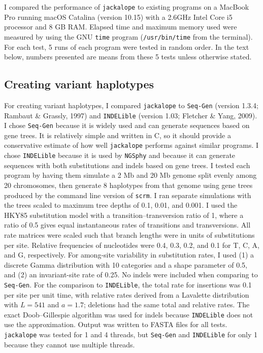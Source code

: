 \documentclass[12pt,]{article}
\begin{document}
I compared the performance of \texttt{jackalope} to existing programs on a MacBook
Pro running macOS Catalina (version 10.15) with a 2.6GHz Intel Core i5 processor
and 8 GB RAM.
Elapsed time and maximum memory used were measured by using the GNU \texttt{time} program
(\texttt{/usr/bin/time} from the terminal).
For each test, 5 runs of each program were tested in random order.
In the text below, numbers presented are means from these 5 tests unless otherwise stated.

\hypertarget{creating-variant-haplotypes-1}{%
\subsection{Creating variant haplotypes}\label{creating-variant-haplotypes-1}}

For creating variant haplotypes, I compared \texttt{jackalope} to
\texttt{Seq-Gen} (version 1.3.4; Rambaut \& Grassly, 1997) and
\texttt{INDELible} (version 1.03; Fletcher \& Yang, 2009).
I chose \texttt{Seq-Gen} because it is widely used and can generate sequences based on
gene trees.
It is relatively simple and written in C, so it should provide a conservative
estimate of how well \texttt{jackalope} performs against similar programs.
I chose \texttt{INDELible} because it is used by \texttt{NGSphy} and because it can generate
sequences with both substitutions and indels based on gene trees.
I tested each program by having them simulate a 2 Mb and 20 Mb genome
split evenly among 20 chromosomes, then generate 8 haplotypes from that genome using
gene trees produced by the command line version of \texttt{scrm}.
I ran separate simulations with the trees scaled to maximum tree depths of 0.1, 0.01,
and 0.001.
I used the HKY85 substitution model with a transition--transversion ratio of 1,
where a ratio of 0.5 gives equal instantaneous rates of transitions and transversions.
All rate matrices were scaled such that branch lengths were in units of
substitutions per site.
Relative frequencies of nucleotides were 0.4, 0.3, 0.2, and 0.1 for T, C, A, and G,
respectively.
For among-site variability in substitution rates, I used
(1) a discrete Gamma distribution with 10 categories and a shape parameter of 0.5, and
(2) an invariant-site rate of 0.25.
No indels were included when comparing to \texttt{Seq-Gen}.
For the comparison to \texttt{INDELible}, the total rate for insertions was 0.1 per site
per unit time, with relative rates derived from a Lavalette distribution with
\(L = 541\) and \(a = 1.7\); deletions had the same total and relative rates.
The exact Doob--Gillespie algorithm was used for indels because \texttt{INDELible} does
not use the approximation.
Output was written to FASTA files for all tests.
\texttt{jackalope} was tested for 1 and 4 threads, but
\texttt{Seq-Gen} and \texttt{INDELible} for only 1 because they cannot use multiple threads.
\end{document}
